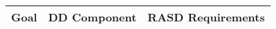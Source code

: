 \begin{table}[H]
\begin{center}
\begin{tabular}{p{} | p{} | p{}}
\hline
\textbf{Goal} & \textbf{DD Component} & \textbf{RASD Requirements}\\
\hline
\end{tabular}
\end{center}
\end{table}